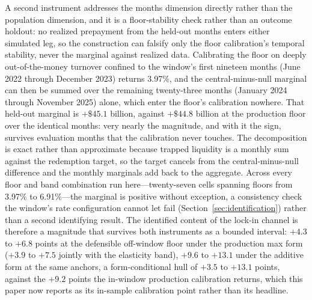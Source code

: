 \documentclass[12pt]{article}
\begin{document}
A second instrument addresses the months dimension directly rather than the population dimension, and it is a floor-stability check rather than an outcome holdout: no realized prepayment from the held-out months enters either simulated leg, so the construction can falsify only the floor calibration's temporal stability, never the marginal against realized data. Calibrating the floor on deeply out-of-the-money turnover confined to the window's first nineteen months (June 2022 through December 2023) returns 3.97\%, and the central-minus-null marginal can then be summed over the remaining twenty-three months (January 2024 through November 2025) alone, which enter the floor's calibration nowhere. That held-out marginal is $+\$45.1$ billion, against $+\$44.8$ billion at the production floor over the identical months: very nearly the magnitude, and with it the sign, survives evaluation months that the calibration never touches. The decomposition is exact rather than approximate because trapped liquidity is a monthly sum against the redemption target, so the target cancels from the central-minus-null difference and the monthly marginals add back to the aggregate. Across every floor and band combination run here---twenty-seven cells spanning floors from 3.97\% to 6.91\%---the marginal is positive without exception, a consistency check the window's rate configuration cannot let fail (Section~\ref{sec:identification}) rather than a second identifying result. The identified content of the lock-in channel is therefore a magnitude that survives both instruments as a bounded interval: $+4.3$ to $+6.8$ points at the defensible off-window floor under the production max form ($+3.9$ to $+7.5$ jointly with the elasticity band), $+9.6$ to $+13.1$ under the additive form at the same anchors, a form-conditional hull of $+3.5$ to $+13.1$ points, against the $+9.2$ points the in-window production calibration returns, which this paper now reports as its in-sample calibration point rather than its headline.
\end{document}
